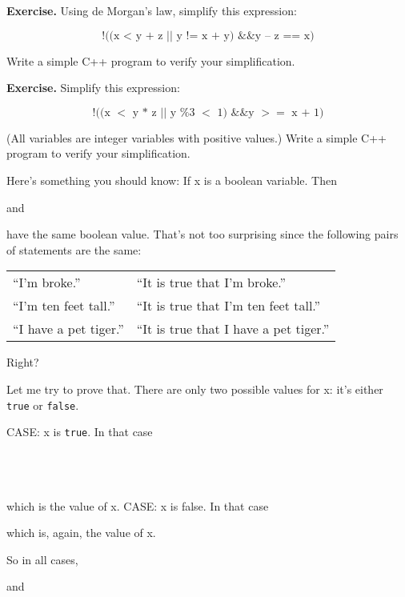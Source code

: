 {{{{{\textbf{Exercise.} Using de Morgan's law, simplify this expression:

\[\text{!((x < y + z $||$ y != x + y) \&\& y – z == x)}\]

Write a simple C++ program to verify your simplification.

\textbf{Exercise.} Simplify this expression:

\[\text{!((x $<$ y * z $||$ y \% 3 $<$ 1) \&\& y $>=$ x + 1)}\]

(All variables are integer variables with positive values.) Write a simple
C++ program to verify your simplification.

\newpage{}

Here's something you should know: If x is a boolean variable. Then


and


have the same boolean value. That's not too surprising since the
following pairs of statements are the same:

\begin{tabular}{p{5cm} p{7cm}}
“I'm broke.” & “It is true that I'm broke.”\\
“I'm ten feet tall.” & “It is true that I'm ten feet tall.”\\
“I have a pet tiger.” & “It is true that I have a pet tiger.”\\
\end{tabular}

Right?

Let me try to prove that. There are only two possible values for x: it's
either \verb!true! or \verb!false!.

CASE: x is \verb!true!. In that case

\\
\\
\\

which is the value of x.
CASE: x is false. In that case


which is, again, the value of x.

So in all cases,


and

}}}}}
